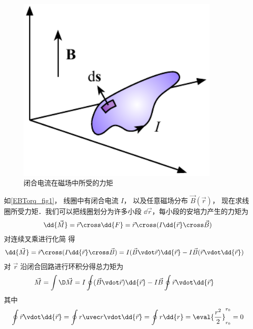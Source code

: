 
\begin{figure}[ht]
\centering
\includegraphics[width=10cm]{./figures/EBTorq.pdf}
\caption{闭合电流在磁场中所受的力矩} \label{EBTorq_fig1}
\end{figure}
如\autoref{EBTorq_fig1}， 线圈中有闭合电流 $I$， 以及任意磁场分布 $\vec B(\vec r)$， 现在求线圈所受力矩．我们可以把线圈划分为许多小段 $\dd{\vec r}$，每小段的安培力产生的力矩为
\begin{equation}
\dd{\vec M} = \vec r\cross \dd{F} = \vec r \cross (I \dd{\vec r} \cross \vec B)
\end{equation}
对连续叉乘进行化简 得
\begin{equation}
\begin{aligned}
\dd{\vec M} &=  \vec r \cross (I\dd{\vec r} \cross \vec B) =  I (\vec B \vdot \vec r) \dd{\vec r}  -  I\vec B (\vec r \vdot \dd{\vec r})
\end{aligned}
\end{equation}
对 $\vec r$ 沿闭合回路进行环积分得总力矩为
\begin{equation}
\begin{aligned}
\vec M & = \int \D\vec M = I\oint (\vec B\vdot\vec r)\dd{\vec r}  - I\vec B\oint \vec r \vdot \dd{\vec r}
\end{aligned}
\end{equation}
其中
\begin{equation}
\oint \vec r \vdot \dd{\vec r}  = \oint r \uvec r \vdot \dd{\vec r}  = \oint r \dd{r}  = \eval{\frac{r^2}{2}}_{r_0}^{r_0}  = 0 %
\end{equation}
